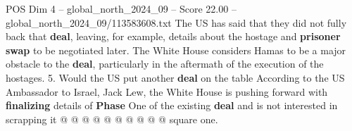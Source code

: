 \begin{textsample}{POS Dim 4 – global\_north\_2024\_09 – Score 22.00 – global\_north\_2024\_09/113583608.txt}
The US has said that they did not fully back that \textbf{deal}, leaving, for example, details about the hostage and \textbf{prisoner} \textbf{swap} to be negotiated later.
The White House considers Hamas to be a major obstacle to the \textbf{deal}, particularly in the aftermath of the execution of the hostages. 5.
Would the US put another \textbf{deal} on the table According to the US Ambassador to Israel, Jack Lew, the White House is pushing forward with \textbf{finalizing} details of \textbf{Phase} One of the existing \textbf{deal} and is not interested in scrapping it @ @ @ @ @ @ @ @ @ @ square one.

\end{textsample}
